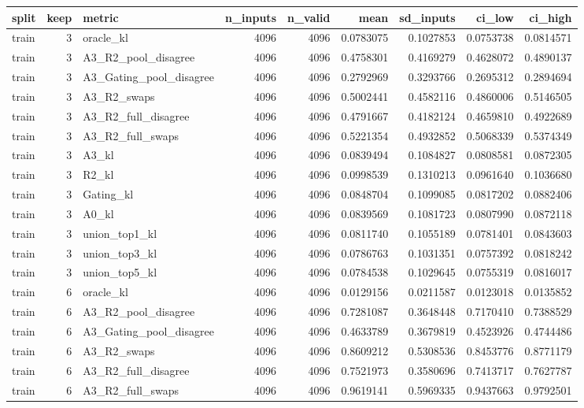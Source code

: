 \begin{tabular}{lrlrrrrrr}
\toprule
split & keep & metric & n_inputs & n_valid & mean & sd_inputs & ci_low & ci_high \\
\midrule
train & 3 & oracle_kl & 4096 & 4096 & 0.0783075 & 0.1027853 & 0.0753738 & 0.0814571 \\
train & 3 & A3_R2_pool_disagree & 4096 & 4096 & 0.4758301 & 0.4169279 & 0.4628072 & 0.4890137 \\
train & 3 & A3_Gating_pool_disagree & 4096 & 4096 & 0.2792969 & 0.3293766 & 0.2695312 & 0.2894694 \\
train & 3 & A3_R2_swaps & 4096 & 4096 & 0.5002441 & 0.4582116 & 0.4860006 & 0.5146505 \\
train & 3 & A3_R2_full_disagree & 4096 & 4096 & 0.4791667 & 0.4182124 & 0.4659810 & 0.4922689 \\
train & 3 & A3_R2_full_swaps & 4096 & 4096 & 0.5221354 & 0.4932852 & 0.5068339 & 0.5374349 \\
train & 3 & A3_kl & 4096 & 4096 & 0.0839494 & 0.1084827 & 0.0808581 & 0.0872305 \\
train & 3 & R2_kl & 4096 & 4096 & 0.0998539 & 0.1310213 & 0.0961640 & 0.1036680 \\
train & 3 & Gating_kl & 4096 & 4096 & 0.0848704 & 0.1099085 & 0.0817202 & 0.0882406 \\
train & 3 & A0_kl & 4096 & 4096 & 0.0839569 & 0.1081723 & 0.0807990 & 0.0872118 \\
train & 3 & union_top1_kl & 4096 & 4096 & 0.0811740 & 0.1055189 & 0.0781401 & 0.0843603 \\
train & 3 & union_top3_kl & 4096 & 4096 & 0.0786763 & 0.1031351 & 0.0757392 & 0.0818242 \\
train & 3 & union_top5_kl & 4096 & 4096 & 0.0784538 & 0.1029645 & 0.0755319 & 0.0816017 \\
train & 6 & oracle_kl & 4096 & 4096 & 0.0129156 & 0.0211587 & 0.0123018 & 0.0135852 \\
train & 6 & A3_R2_pool_disagree & 4096 & 4096 & 0.7281087 & 0.3648448 & 0.7170410 & 0.7388529 \\
train & 6 & A3_Gating_pool_disagree & 4096 & 4096 & 0.4633789 & 0.3679819 & 0.4523926 & 0.4744486 \\
train & 6 & A3_R2_swaps & 4096 & 4096 & 0.8609212 & 0.5308536 & 0.8453776 & 0.8771179 \\
train & 6 & A3_R2_full_disagree & 4096 & 4096 & 0.7521973 & 0.3580696 & 0.7413717 & 0.7627787 \\
train & 6 & A3_R2_full_swaps & 4096 & 4096 & 0.9619141 & 0.5969335 & 0.9437663 & 0.9792501 \\

\end{tabular}

